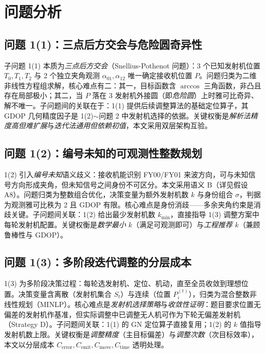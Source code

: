 \documentclass[12pt,a4paper]{ctexart}
\begin{document}
\section{问题分析}

\subsection{问题 1(1)：三点后方交会与危险圆奇异性}

子问题 1(1) 本质为\emph{三点后方交会}（Snellius-Pothenot 问题）：3 个已知发射机位置 $T_0,T_1,T_2$ 与 2 个独立夹角观测 $\alpha_{01},\alpha_{12}$ 唯一确定接收机位置 $P$。问题归类为二维非线性方程组求解，核心难点有二：其一，目标函数含 $\arccos$ 三角函数，非凸且存在局部极小；其二，当 $P$ 落在 3 发射机外接圆（即\emph{危险圆}）上时雅可比奇异、解不唯一。子问题间的关联在于：1(1) 提供后续调整算法的基础定位算子，其 GDOP 几何精度因子是 1(2)$\sim$问题 2 中发射机选择的依据。关键权衡是\emph{解析法精度高但难扩展}与\emph{迭代法通用但依赖初值}，本文采用双层架构互验。

\subsection{问题 1(2)：编号未知的可观测性整数规划}

1(2) 引入\emph{编号未知}语义歧义：接收机能识别 FY00/FY01 来波方向，可与未知信号方向形成夹角，但未知信号之间身份不可区分。本文采用语义 B（详见假设 A8）。问题归类为整数组合优化，决策变量为额外发射机数 $k$ 与身份组合 $\sigma$，判据为观测雅可比秩为 2 且 GDOP 有限。核心难点是身份消歧——多余夹角约束是消歧关键。子问题间关联：1(2) 给出最少发射机数 $k_{\min}$，直接指导 1(3) 调整方案中每轮发射机配置。关键权衡是\emph{数学最小 $k$}（满足可观测即可）与\emph{工程推荐 $k$}（兼顾鲁棒性与 GDOP）。

\subsection{问题 1(3)：多阶段迭代调整的分层成本}

1(3) 为多阶段决策过程：每轮选发射机、定位、机动，直至全员收敛到理想位置。决策变量含离散（发射机集合 $S_t$）与连续（位置 $P_i^{(t)}$），归类为混合整数非线性规划（MINLP）。核心难点是\emph{发射机选择策略}与\emph{收敛性证明}：题目要求位置无偏差的发射机作基准，但实际调整中已调整无人机可作为下轮无偏差发射机（Strategy D）。子问题间关联：1(1) 的 GN 定位算子直接复用；1(2) 的 $k$ 值指导发射机数上限。关键权衡是\emph{调整精度}（主目标偏差）与\emph{调整次数}（次目标效率），本文以分层成本 $C_{\text{error}},C_{\text{emit}},C_{\text{move}},C_{\text{time}}$ 透明处理。
\end{document}
